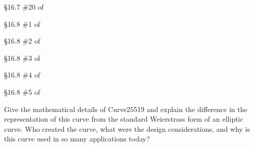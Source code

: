 \begin{problem}[20 points]
	\S 16.7 \#20 of \cite {tw}
\end{problem}

\begin{problem}[15 points]
	\S 16.8 \#1 of \cite {tw}
\end{problem}

\begin{problem}[10 points]
	\S 16.8 \#2 of \cite {tw}
\end{problem}

\begin{problem}[20 points]
	\S 16.8 \#3 of \cite {tw}
\end{problem}

\begin{problem}[15 points]
	\S 16.8 \#4 of \cite {tw}
\end{problem}

\begin{problem}[10 points]
	\S 16.8 \#5 of \cite {tw}
\end{problem}

\begin{problem}[20 points]
	Give the mathematical details of Curve25519 and explain the difference in the representation of this curve from the standard Weierstrass form of an elliptic curve. Who created the curve, what were the design considerations, and why is this curve used in so many applications today?
\end{problem}
